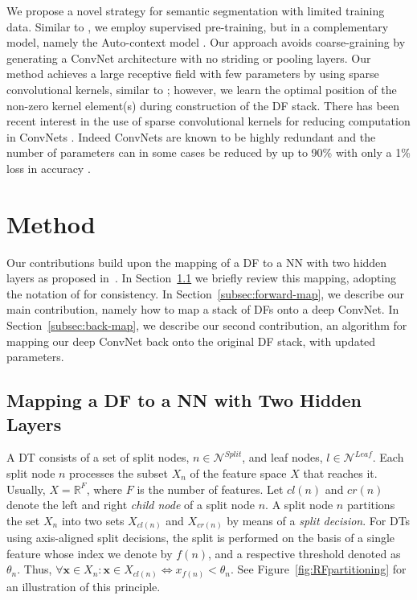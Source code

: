 \documentclass[twocolumn]{svjour3}
\begin{document}
We propose a novel strategy for semantic segmentation with limited training data.
Similar to \cite{Fahlman, Lengelle}, we employ supervised pre-training, but in a complementary model, namely the Auto-context model \cite{Tu2010}.
Our approach avoids coarse-graining by generating a ConvNet architecture with no striding or pooling layers. 
Our method achieves a large receptive field with few parameters by using sparse convolutional kernels, similar to \cite{Chen, Yu:2015uc}; however, we learn the optimal position of the non-zero kernel element(s) during construction of the DF stack.
There has been recent interest in the use of sparse convolutional kernels for reducing computation in ConvNets \cite{Zisserman:lowRank, Criminsi:lowRank, Liu:sparseCNN}.  
Indeed ConvNets are known to be highly redundant and the number of parameters can in some cases be reduced by up to 90\% with only a 1\% loss in accuracy \cite{Liu:sparseCNN}.

\section{Method}
\label{sec:method}

%
Our contributions build upon the mapping of a DF to a NN with two hidden layers as proposed in~\cite{Sethi1990,Welbl14}.
In Section~\ref{subsec:welbl} we briefly review this mapping, adopting the notation of \cite{Welbl14} for consistency.
In Section~\ref{subsec:forward-map}, we describe our main contribution, namely how to map a stack of DFs onto a deep ConvNet.
In Section~\ref{subsec:back-map}, we describe our second contribution, an algorithm for mapping our deep ConvNet back onto the original DF stack, with updated parameters.

\subsection{Mapping a DF to a NN with Two Hidden Layers}
\label{subsec:welbl}

A DT consists of a set of split nodes, $n \in \mathcal{N}^{Split}$, and leaf nodes, $l \in \mathcal{N}^{Leaf}$.
Each split node $n$ processes the subset $X_n$ of the feature space $X$ that reaches it. 
Usually, $X=\mathbb{R}^F$, where $F$ is the number of features. 
%
Let $cl(n)$ and $cr(n)$ denote the left and right \emph{child node} of a split node $n$.
A split node $n$ partitions the set $X_n$ into two sets $X_{cl(n)}$ and $X_{cr(n)}$ by means of a \emph{split decision}.
%
For DTs using axis-aligned split decisions, the split is performed on the basis of a single feature whose index we denote by $f(n)$, and a respective threshold denoted as $\theta_n$.  Thus, 
$\forall \mathbf{x} \in X_n: \mathbf{x} \in X_{cl(n)} \Longleftrightarrow x_{f(n)} < \theta_n $.  
See Figure~\ref{fig:RFpartitioning} for an illustration of this principle.
\end{document}
